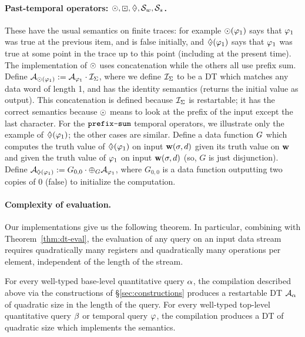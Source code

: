 \paragraph*{Past-temporal operators: $\odot, \boxdot, \;\cdot\hspace{-0.52em}\Diamond, \mathbin{\mathcal{S}_w}, \mathbin{\mathcal{S}_s}{}$.}
These have the usual semantics on finite traces: for example $\odot(\varphi_1)$ says that $\varphi_1$ was true at the previous item, and is false initially, and $\;\cdot\hspace{-0.52em}\Diamond(\varphi_1)$ says that $\varphi_1$ was true at some point in the trace up to this point (including at the present time). The implementation of $\odot$ uses concatenation while the others all use prefix sum. Define $\mathcal{A}_{\odot(\varphi_1)} := \mathcal{A}_{\varphi_1} \cdot \mathcal{I}_{\Sigma}$, where we define $\mathcal{I}_{\Sigma}$ to be a DT which matches any data word of length 1, and has the identity semantics (returns the initial value as output). This concatenation is defined because $\mathcal{I}_{\Sigma}$ is restartable; it has the correct semantics because $\odot$ means to look at the prefix of the input except the last character.
For the $\texttt{prefix-sum}$ temporal operators, we illustrate only the example of $\;\cdot\hspace{-0.52em}\Diamond(\varphi_1)$; the other cases are similar. Define a data function $G$ which computes the truth value of $\;\cdot\hspace{-0.52em}\Diamond(\varphi_1)$ on input $\textbf{w} (\sigma, d)$ given its truth value on $\textbf{w}$ and given the truth value of $\varphi_1$ on input $\textbf{w} (\sigma, d)$ (so, $G$ is just disjunction). Define $\DT_{\eventuallyT(\tq_1)} := \concat{G_{0,0}}{\prefixsum{\DT_{\tq_1}}{\DF}}$, where $G_{0,0}$ is a data function outputting two copies of $0$ (false) to initialize the computation.

\paragraph*{Complexity of \QREpast{} evaluation.}
Our implementations give us the following theorem. In particular, combining with Theorem~\ref{thm:dt-eval}, the evaluation of any query on an input data stream requires quadratically many registers and quadratically many operations per element, independent of the length of the stream.

\begin{theorem}
For every well-typed base-level quantitative query $\alpha$, the compilation described above via the constructions of \S\ref{sec:constructions} produces a restartable DT $\mathcal{A}_\alpha$ of quadratic size in the length of the query. For every well-typed top-level quantitative query $\beta$ or temporal query $\varphi$, the compilation produces a DT of quadratic size which implements the semantics.
\end{theorem}

